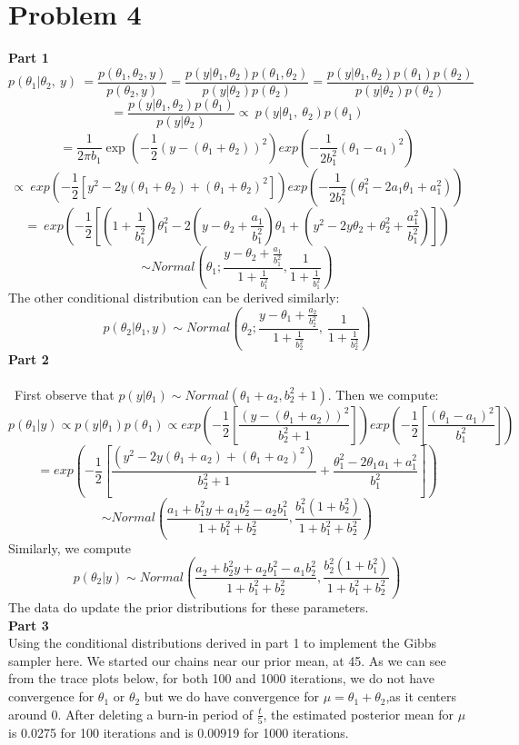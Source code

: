 \documentclass[10pt,a4paper]{article}
\begin{document}
\section*{Problem 4}
\textbf{Part 1}
$$
p(\theta_{1}|\theta_{2},\ y)\ =\frac{p(\theta_{1},\theta_{2},y)}{p(\theta_{2},y)}
=\frac{p(y|\theta_{1},\theta_{2})p(\theta_{1},\theta_{2})}{p(y|\theta_{2})p(\theta_{2})}
=\frac{p(y|\theta_{1},\theta_{2})p(\theta_{1})p(\theta_{2})}{p(y|\theta_{2})p(\theta_{2})}
$$
$$
=\frac{p(y|\theta_{1},\theta_{2})p(\theta_{1})}{p(y|\theta_{2})}
\propto\ p(y|\theta_{1},\ \theta_{2})p(\theta_{1})
$$
$$=\frac{1}{2\pi b_1}\exp(-\frac{1}{2}(y-(\theta_{1}+\theta_{2}))^{2})exp(-\frac{1}{2b_{1}^{2}}(\theta_{1}-a_{1})^{2})$$
$$
\propto\ exp(-\frac{1}{2}[y^{2}-2y(\theta_{1}+\theta_{2})+(\theta_{1}+\theta_{2})^{2}])exp(-\frac{1}{2b_{1}^{2}}(\theta_{1}^{2}-2a_{1}\theta_{1}+a_{1}^{2}))
$$
$$
=\ exp(-\frac{1}{2}[(1+\frac{1}{b_{1}^{2}})\theta_{1}^{2}-2(y-\theta_{2}+\frac{a_{1}}{b_{1}^{2}})\theta_{1}+(y^{2}-2y\theta_{2}+\theta_{2}^{2}+\frac{a_{1}^{2}}{b_{1}^{2}})])
$$
$$\sim Normal(\displaystyle \theta_{1};\frac{y-\theta_{2}+\frac{a_{1}}{b_{1}^{2}}}{1+\frac{1}{b_{1}^{2}}},\frac{1}{1+\frac{1}{b_{1}^{2}}})
$$
The other conditional distribution can be derived similarly:
$$
p(\theta_{2}|\theta_{1},y) 
\sim Normal(\displaystyle \theta_{2};\frac{y-\theta_{1}+\frac{a_{2}}{b_{2}^{2}}}{1+\frac{1}{b_{2}^{2}}},\ \frac{1}{1+\frac{1}{b_{2}^{2}}})$$
\textbf{Part 2}\\
\\\
First observe that $p(y|\theta_1) \sim Normal(\theta_1+a_2,b_2^2+1)$. Then we compute:\\
$$
p(\theta_{1}|y) \propto p(y|\theta_1)p(\theta_1)
\propto exp(-\frac{1}{2}[\frac{(y-(\theta_1+a_2))^2}{b_2^2+1}])exp(-\frac{1}{2}[\frac{(\theta_1-a_1)^2}{b_1^2}])$$
$$
= exp(-\frac{1}{2}[\frac{(y^2-2y(\theta_1+a_2)+(\theta_1+a_2)^2)}{b_2^2+1}+\frac{\theta_1^2-2\theta_1 a_1+a_1^2}{b_1^2}])
$$
$$
\sim Normal(\frac{a_{1}+b_{1}^{2}y+a_{1}b_{2}^{2}-a_{2}b_{1}^{2}}{1+b_{1}^{2}+b_{2}^{2}}, \frac{b_{1}^{2}(1+b_{2}^{2})}{1+b_{1}^{2}+b_{2}^{2}})
$$
Similarly, we compute \\
$$ p(\theta_{2}|y) \sim Normal(\frac{a_{2}+b_{2}^{2}y+a_{2}b_{1}^{2}-a_{1}b_{2}^{2}}{1+b_{1}^{2}+b_{2}^{2}}, \frac{b_{2}^{2}(1+b_{1}^{2})}{1+b_{1}^{2}+b_{2}^{2}})$$
The data do update the prior distributions for these parameters.\\
\textbf{Part 3}\\
Using the conditional distributions derived in part 1 to implement the Gibbs sampler here. We started our chains near our prior mean, at 45. As we can see from the trace plots below, for both 100 and 1000 iterations, we do not have convergence for $\theta_1$ or $\theta_2$ but we do have convergence for $\mu=\theta_1+\theta_2$,as it centers around 0. After deleting a burn-in period of $\frac{t}{5}$, the estimated posterior mean for $\mu$ is 0.0275 for 100 iterations and is 0.00919 for 1000 iterations. \\
\end{document}
